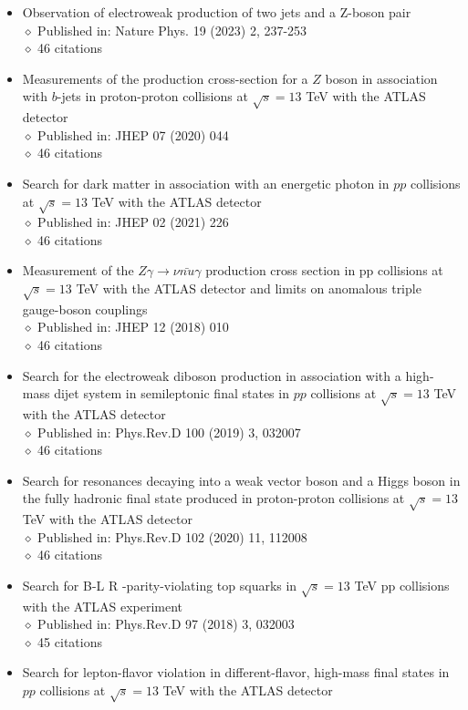 \documentclass[margin, 10pt]{res} %
\begin{document}
\begin{resume}
\begin{itemize}
\item Observation of electroweak production of two jets and a Z-boson pair\\
$\diamond$ Published in: Nature Phys. 19 (2023) 2, 237-253\\
$\diamond$ 46 citations
\item Measurements of the production cross-section for a $Z$ boson in association with $b$-jets in proton-proton collisions at $\sqrt{s} = 13$ TeV with the ATLAS detector\\
$\diamond$ Published in: JHEP 07 (2020) 044\\
$\diamond$ 46 citations
\item Search for dark matter in association with an energetic photon in $pp$ collisions at $\sqrt{s} = 13$ TeV with the ATLAS detector\\
$\diamond$ Published in: JHEP 02 (2021) 226\\
$\diamond$ 46 citations
\item Measurement of the $Z\gamma\rightarrow \nu\bar{nu}\gamma$ production cross section in pp collisions at $\sqrt{s} = 13$ TeV with the ATLAS detector and limits on anomalous triple gauge-boson couplings\\
$\diamond$ Published in: JHEP 12 (2018) 010\\
$\diamond$ 46 citations
\item Search for the electroweak diboson production in association with a high-mass dijet system in semileptonic final states in $pp$ collisions at $\sqrt{s} = 13$ TeV with the ATLAS detector\\
$\diamond$ Published in: Phys.Rev.D 100 (2019) 3, 032007\\
$\diamond$ 46 citations
\item Search for resonances decaying into a weak vector boson and a Higgs boson in the fully hadronic final state produced in proton-proton collisions at $\sqrt{s} = 13$ TeV with the ATLAS detector\\
$\diamond$ Published in: Phys.Rev.D 102 (2020) 11, 112008\\
$\diamond$ 46 citations
\item Search for B-L R -parity-violating top squarks in $\sqrt{s} = 13$ TeV pp collisions with the ATLAS experiment\\
$\diamond$ Published in: Phys.Rev.D 97 (2018) 3, 032003\\
$\diamond$ 45 citations
\item Search for lepton-flavor violation in different-flavor, high-mass final states in $pp$ collisions at $\sqrt{s} = 13$ TeV with the ATLAS detector\\

\end{itemize}
\end{resume}
\end{document}
